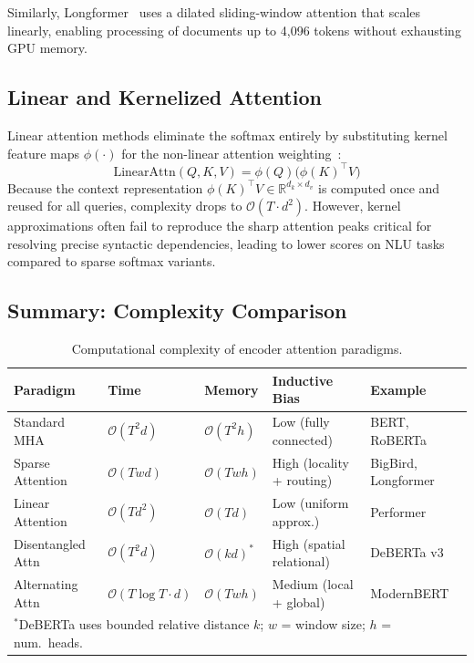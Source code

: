 \documentclass[11pt]{article}
\begin{document}
Similarly, Longformer~\cite{beltagy2020longformer} uses a dilated sliding-window attention that scales linearly, enabling processing of documents up to 4,096 tokens without exhausting GPU memory.

\subsection{Linear and Kernelized Attention}

Linear attention methods eliminate the softmax entirely by substituting kernel feature maps $\phi(\cdot)$ for the non-linear attention weighting~\cite{katharopoulos2020transformers}:
\begin{equation}
  \text{LinearAttn}(Q, K, V) = \phi(Q)\bigl(\phi(K)^\top V\bigr)
  \label{eq:linear_attn}
\end{equation}
Because the context representation $\phi(K)^\top V \in \mathbb{R}^{d_k \times d_v}$ is computed once and reused for all queries, complexity drops to $\mathcal{O}(T \cdot d^2)$. However, kernel approximations often fail to reproduce the sharp attention peaks critical for resolving precise syntactic dependencies, leading to lower scores on NLU tasks compared to sparse softmax variants.

\subsection{Summary: Complexity Comparison}

\begin{table}[h]
\centering
\renewcommand{\arraystretch}{1.3}
\begin{tabular}{@{}lllll@{}}
\toprule
\textbf{Paradigm} & \textbf{Time} & \textbf{Memory} & \textbf{Inductive Bias} & \textbf{Example} \\
\midrule
Standard MHA       & $\mathcal{O}(T^2 d)$ & $\mathcal{O}(T^2 h)$ & Low (fully connected) & BERT, RoBERTa \\
Sparse Attention   & $\mathcal{O}(T w d)$ & $\mathcal{O}(T w h)$ & High (locality + routing) & BigBird, Longformer \\
Linear Attention   & $\mathcal{O}(T d^2)$ & $\mathcal{O}(T d)$   & Low (uniform approx.) & Performer \\
Disentangled Attn  & $\mathcal{O}(T^2 d)$ & $\mathcal{O}(k d)^*$ & High (spatial relational) & DeBERTa v3 \\
Alternating Attn   & $\mathcal{O}(T \log T \cdot d)$ & $\mathcal{O}(T w h)$ & Medium (local + global) & ModernBERT \\
\bottomrule
\multicolumn{5}{l}{\small $^*$DeBERTa uses bounded relative distance $k$; $w$ = window size; $h$ = num.\ heads.}
\end{tabular}
\caption{Computational complexity of encoder attention paradigms.}
\label{tab:complexity}
\end{table}
\end{document}
